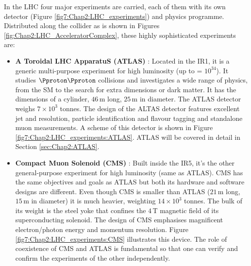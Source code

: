 In the LHC four major experiments are carried, each of them with its own detector (Figure \ref{fig7:Chap2:LHC_experiments})
and physics programme.
Distributed along the collider as is shown in Figures\,\ref{fig:Chap2:LHC_AcceleratorComplex}, 
these highly sophisticated experiments are:
\begin{itemize}
  \item \textbf{A Toroidal LHC ApparatuS (ATLAS)} \cite{ATLAS:2008xda}:
  		Located in the IR1, it is a generic multi-purpose experiment for high luminosity (up to \lumi = $10^{34}$\lumiunits).
		It studies $\Pproton \Pproton$ collisions and investigates a wide range of physics, from the SM to the search for extra dimensions or
		dark matter. It has the dimensions of a cylinder, $46\,$m long, $25\,$m in diameter. The ATLAS detector weighs $7\times 10^{3}$ tonnes.
		The design of the ALTAS detector features excellent jet and \MET resolution, particle identification and flavour tagging
		and standalone muon measurements.  A scheme of this detector is shown in Figure \ref{fig7:Chap2:LHC_experiments:ATLAS}.
		ATLAS will be covered in detail in Section \ref{sec:Chap2:ATLAS}.
	
  \item \textbf{Compact Muon Solenoid (CMS)} \cite{CMS:2008xjf}: 
  		Built inside the IR5, it's the other general-purpose experiment for high luminosity (same \lumi  as ATLAS). 
		CMS has the same objectives and goals as ATLAS but both its hardware and software designs are different. 
		Even though CMS is smaller than ATLAS ($21\,$m long, $15\,$m in diameter) it is much heavier, weighting  $14\times 10^{3}$ tonnes.
		The bulk of its weight is the steel yoke that confines the $4\,$T magnetic field of its superconducting solenoid.
		The design of CMS emphasises magnificent electron/photon energy and momentum resolution. 
		Figure \ref{fig7:Chap2:LHC_experiments:CMS} illustrates this device. 
		The role of coexistence of CMS and ATLAS is fundamental so that one can verify and confirm the experiments of the other
		independently. 
		

\end{itemize}
